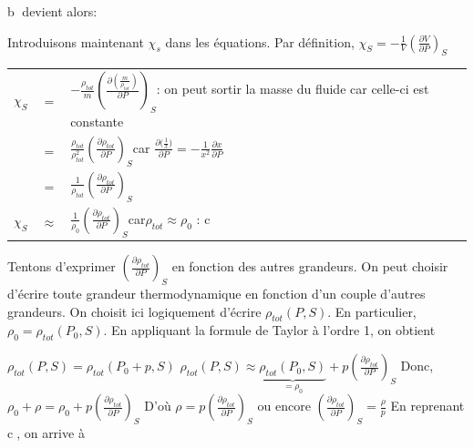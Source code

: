 \documentclass[a4paper, 12pt]{article}
\begin{document}
\textcircled{b} devient alors:
\begin{center}
\end{center}
Introduisons maintenant $\chi_s$ dans les équations.\newline \newline
Par définition, $\chi_S=-\frac{1}{V}{(\frac{\partial V}{\partial P})}_S$
\begin{center}\begin{tabular}{ccl}
\vspace{2mm}
$\chi_S$	    &=& $-\frac{\rho_{tot}}{m}{(\frac{\partial (\frac{m}{\rho_{tot}})}{\partial P})}_S$\quad : on peut sortir la masse du fluide car celle-ci est constante\\
\vspace{2mm}
	            &=&	$\frac{\rho_{tot}}{\rho_{tot}^2}{(\frac{\partial \rho_{tot}}{\partial P})}_S$\quad car $\frac{\partial {(\frac{1}{x}})}{\partial P}=-\frac{1}{x^2}\frac{\partial x}{\partial P}$ \\
\vspace{2mm}
	            &=&	$\frac{1}{\rho_{tot}}{(\frac{\partial \rho_{tot}}{\partial P})}_S$\\
\vspace{2mm}
$\chi_S$	    &$\approx$&	$\frac{1}{\rho_0}{(\frac{\partial \rho_{tot}}{\partial P})}_S$\quad car$\rho_{tot}\approx\rho_0$    : \textcircled{c}
\end{tabular}\end{center}
Tentons d'exprimer ${(\frac{\partial \rho_{tot}}{\partial P})}_S$ en fonction des autres grandeurs.\newline
On peut choisir d'écrire toute grandeur thermodynamique en fonction d'un couple d'autres grandeurs. On choisit ici logiquement d'écrire $\rho_{tot}(P,S)$. En particulier, $\rho_0=\rho_{tot}(P_0,S)$.\newline
En appliquant la formule de Taylor à l'ordre 1, on obtient
\begin{center}
$\rho_{tot}(P,S)=\rho_{tot}(P_0+p,S)$\newline
$\rho_{tot}(P,S)\approx\underbrace{\rho_{tot}(P_0,S)}_{=\rho_0}+p{(\frac{\partial \rho_{tot}}{\partial P})}_S$\newline
Donc, $\rho_0+\rho=\rho_0+p{(\frac{\partial \rho_{tot}}{\partial P})}_S$\newline \newline
D'où $\rho=p{(\frac{\partial \rho_{tot}}{\partial P})}_S$ ou encore ${(\frac{\partial \rho_{tot}}{\partial P})}_S=\frac{\rho}{p}$\newline \newline
En reprenant \textcircled{c}, on arrive à\newline \newline
{}
\end{center}
\end{document}
